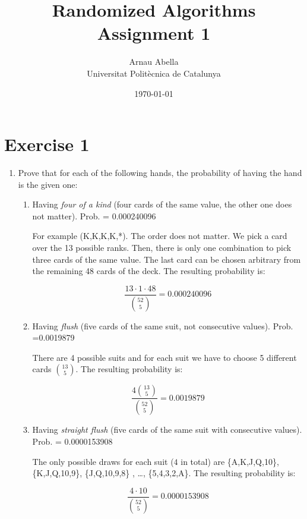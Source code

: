 \documentclass[12pt, a4paper]{article} %
\title{%
  Randomized Algorithms\\
  \large{Assignment 1}
}
\author{%
  Arnau Abella \\
  \large{Universitat Polit\`ecnica de Catalunya}
}
\date{\today}
\begin{document}
\maketitle


\section*{Exercise 1}%
\label{sec:exercise_1}

\begin{enumerate}[label=( \alph*)]
  \item Prove that for each of the following hands, the probability of having the hand is the given one:
    \begin{enumerate}[label=\textbullet]
      \item Having \textit{four of a kind} (four cards of the same value, the other one does not matter). Prob. = 0.000240096

        For example (K,K,K,K,*). The order does not matter. We pick a card over the 13 possible ranks. Then, there is only one combination to pick three cards of the same value. The last card can be chosen arbitrary from the remaining 48 cards of the deck. The resulting probability is:

        \begin{equation}
          \frac{13 \cdot 1 \cdot 48}{\binom{52}{5}} = 0.000240096
        \end{equation}

      \item Having \textit{flush} (five cards of the same suit, not consecutive values). Prob. =0.0019879

        There are 4 possible suits and for each suit we have to choose 5 different cards $\binom{13}{5}$. The resulting probability is:

        \begin{equation}
          \frac{4 \binom{13}{5}}{\binom{52}{5}} = 0.0019879
        \end{equation}

      \item Having \textit{straight flush}  (five cards of the same suit with consecutive values). Prob. = 0.0000153908

        The only possible draws for each suit ($4$ in total) are \{A,K,J,Q,10\}, \{K,J,Q,10,9\}, \{J,Q,10,9,8\} , \ldots, \{5,4,3,2,A\}. The resulting probability is:

        \begin{equation}
          \frac{4 \cdot 10}{\binom{52}{5}} = 0.0000153908
        \end{equation}


\end{enumerate}
\end{enumerate}
\end{document}
